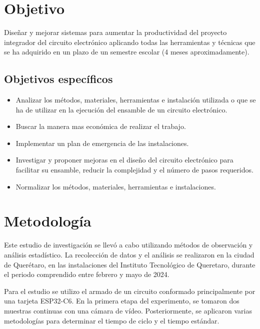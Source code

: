     \section{Objetivo}
    Diseñar y mejorar sistemas para aumentar la productividad del proyecto integrador del circuito electrónico aplicando todas las herramientas y técnicas que se ha adquirido en un plazo de un semestre escolar (4 meses aproximadamente).
    
    \subsection{Objetivos específicos }
    
    \begin{itemize}
        \item Analizar los métodos, materiales, herramientas e instalación utilizada o que se ha de utilizar en la ejecución del ensamble de un circuito electrónico.
        \item Buscar la manera mas económica de realizar el trabajo.
        \item Implementar un plan de emergencia de las instalaciones.
        \item Investigar y proponer mejoras en el diseño del circuito electrónico para facilitar su ensamble, reducir la complejidad y el número de pasos requeridos.
        \item Normalizar los métodos, materiales, herramientas e instalaciones.
        
    
    \end{itemize}
    
    \section{Metodología} %
    
    Este estudio de investigación se llevó a cabo utilizando métodos de observación y análisis estadístico. La recolección de datos y el análisis se realizaron en la ciudad de Querétaro, en las instalaciones del Instituto Tecnológico de Queretaro, durante el periodo comprendido entre febrero y mayo de 2024.
    
    Para el estudio se utilizo el armado de un circuito  conformado principalmente por una tarjeta ESP32-C6.
    En la primera etapa del experimento, se tomaron dos muestras continuas con una cámara de vídeo. Posteriormente, se aplicaron varias metodologías para determinar el tiempo de ciclo y el tiempo estándar.
    
